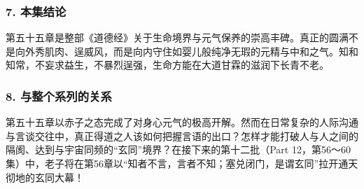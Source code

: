 \subsubsection{7. 本集结论}
第五十五章是整部《道德经》关于生命境界与元气保养的崇高丰碑。真正的圆满不是向外秀肌肉、逞威风，而是向内守住如婴儿般纯净无瑕的元精与中和之气。知和知常，不妄求益生，不暴烈逞强，生命方能在大道甘霖的滋润下长青不老。

\subsubsection{8. 与整个系列的关系}
第五十五章以赤子之态完成了对身心元气的极高开解。然而在日常复杂的人际沟通与言谈交往中，真正得道之人该如何把握言语的出口？怎样才能打破人与人之间的隔阂、达到与宇宙同频的“玄同”境界？在接下来的第十二批（Part 12，第56～60集）中，老子将在第56章以“知者不言，言者不知；塞兑闭门，是谓玄同”拉开通天彻地的玄同大幕！